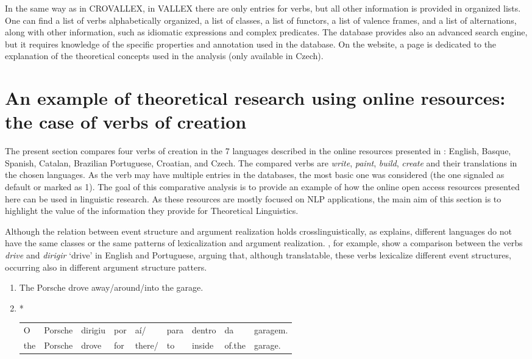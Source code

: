 \documentclass[english]{textolivre}
\begin{document}
In the same way as in CROVALLEX, in VALLEX there are only entries for verbs, but all other information is provided in organized lists. One can find a list of verbs alphabetically organized, a list of classes, a list of functors, a list of valence frames, and a list of alternations, along with other information, such as idiomatic expressions and complex predicates. The database provides also an advanced search engine, but it requires knowledge of the specific properties and annotation used in the database. On the website, a page is dedicated to the explanation of the theoretical concepts used in the analysis (only available in Czech).

\section{An example of theoretical research using online resources: the case of verbs of creation}\label{Section4}

The present section compares four verbs of creation in the 7 languages described in the online resources presented in : English, Basque, Spanish, Catalan, Brazilian Portuguese, Croatian, and Czech. The compared verbs are \textit{write}, \textit{paint}, \textit{build}, \textit{create} and their translations in the chosen languages. As the verb may have multiple entries in the databases, the most basic one was considered (the one signaled as default or marked as 1). The goal of this comparative analysis is to provide an example of how the online open access resources presented here can be used in linguistic research. As these resources are mostly focused on NLP applications, the main aim of this section is to highlight the value of the information they provide for Theoretical Linguistics.

Although the relation between event structure and argument realization holds crosslinguistically, as \textcite{levin_english_1993} explains, different languages do not have the same classes or the same patterns of lexicalization and argument realization. \textcite{amaral_metonymy_2020}, for example, show a comparison between the verbs \textit{drive} and \textit{dirigir} ‘drive’ in English and Portuguese, arguing that, although translatable, these verbs lexicalize different event structures, occurring also in different argument structure patters.

\begin{enumerate}[label=(\arabic*),resume]
\item \label{itm18}The Porsche drove away/around/into the garage.
\item \label{itm19}*\begin{tabular}[t]{*{9}{@{}l@{\hskip3pt}}}
    O & Porsche & dirigiu & por & aí/ & para & dentro & da & garagem. \\
    the & Porsche & drove & for & there/ & to  & inside & of.the & garage.
    \end{tabular} \\
\cite[p.~25]{amaral_metonymy_2020}
\end{enumerate}
\end{document}
